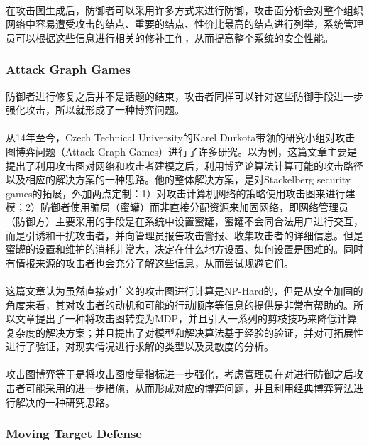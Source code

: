 \documentclass[12pt,a4paper]{article}
\begin{document}
\paragraph{}
在攻击图生成后，防御者可以采用许多方式来进行防御，攻击面分析会对整个组织网络中容易遭受攻击的结点、重要的结点、性价比最高的结点进行列举，系统管理员可以根据这些信息进行相关的修补工作，从而提高整个系统的安全性能。

\subsubsection{Attack Graph Games}
防御者进行修复之后并不是话题的结束，攻击者同样可以针对这些防御手段进一步强化攻击，所以就形成了一种博弈问题。
\paragraph{}
从14年至今，Czech Technical University的Karel Durkota带领的研究小组对攻击图博弈问题（Attack Graph Games）进行了许多研究\cite{18}\cite{19}\cite{20}\cite{21}\cite{22}\cite{23}。以\cite{19}为例，这篇文章主要是提出了利用攻击图对网络和攻击者建模之后，利用博弈论算法计算可能的攻击路径以及相应的解决方案的一种思路。他的整体解决方案，是对Stackelberg security games的拓展，外加两点定制：1）对攻击计算机网络的策略使用攻击图来进行建模；2）防御者使用骗局（蜜罐）而非直接分配资源来加固网络，即网络管理员（防御方）主要采用的手段是在系统中设置蜜罐，蜜罐不会同合法用户进行交互，而是引诱和干扰攻击者，并向管理员报告攻击警报、收集攻击者的详细信息。但是蜜罐的设置和维护的消耗非常大，决定在什么地方设置、如何设置是困难的。同时有情报来源的攻击者也会充分了解这些信息，从而尝试规避它们。
\paragraph{}
这篇文章认为虽然直接对广义的攻击图进行计算是NP-Hard的，但是从安全加固的角度来看，其对攻击者的动机和可能的行动顺序等信息的提供是非常有帮助的。所以文章提出了一种将攻击图转变为MDP，并且引入一系列的剪枝技巧来降低计算复杂度的解决方案；并且提出了对模型和解决算法基于经验的验证，并对可拓展性进行了验证，对现实情况进行求解的类型以及灵敏度的分析。
\paragraph{}
攻击图博弈等于是将攻击图度量指标进一步强化，考虑管理员在对进行防御之后攻击者可能采用的进一步措施，从而形成对应的博弈问题，并且利用经典博弈算法进行解决的一种研究思路。

\subsubsection{Moving Target Defense}
\end{document}

